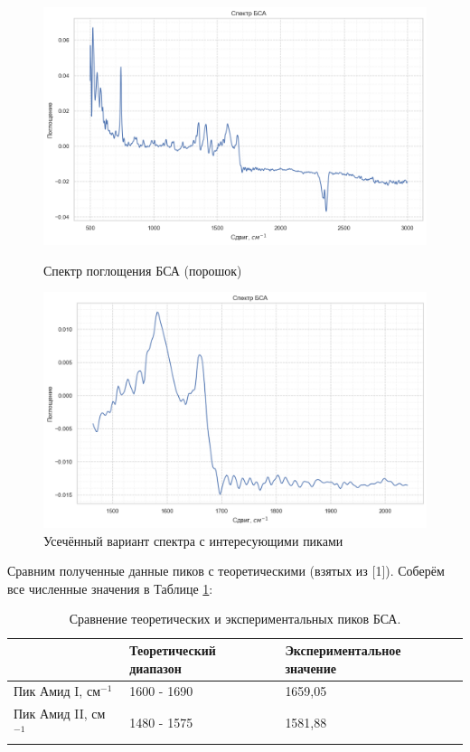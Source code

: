\documentclass{article}
\begin{document}
\begin{figure}[h!] 
        \centering
        \centering
            \includegraphics[width=0.9\linewidth]{Images/БСА.png}
                 \caption{Спектр поглощения БСА (порошок)}
                 \label{БСА}
        \endminipage\hfill
        \centering
             \includegraphics[width=0.9\linewidth]{Images/БСА усечённое.png}
                 \caption{Усечённый вариант спектра с интересующими пиками}
                 \label{БСА усечённое}
        \endminipage
\end{figure}

Сравним полученные данные пиков с теоретическими (взятых из [1]). Соберём все численные значения в Таблице \ref{БСА_табл}:

\begin{table}[h!]
\centering
\caption{Сравнение теоретических и экспериментальных пиков БСА.}
\begin{tabular}{|l|l|l|}
\hline
 & Теоретический диапазон & Экспериментальное значение \\ \hline
Пик Амид I, см$^{-1}$ & 1600 - 1690 & 1659,05 \\ \hline
Пик Амид II, см$^{-1}$& 1480 - 1575 & 1581,88 \\ \hline
\end{tabular}
\label{БСА_табл}
\end{table}
\end{document}
